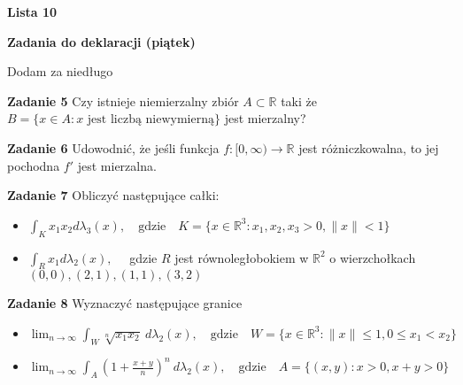 \documentclass[a4paper,11pt]{article}
\newcommand{\RR}{\mathbb{R}}
\begin{document}
\begin{center}
  {\large\textbf{Lista 10}}
\end{center}

\hrulefill
\begin{center}
    \textbf{Zadania do deklaracji (piątek)}
\end{center}

\bigskip

Dodam za niedługo

\bigskip

\hrulefill

\bigskip

\textbf{Zadanie 5} Czy istnieje niemierzalny zbiór $A \subset \RR$ taki że 
$B= \{x \in A : x \text{~jest liczbą niewymierną}\}$ jest mierzalny?

\bigskip

\textbf{Zadanie 6} Udowodnić, że jeśli funkcja $f : [0,\infty) \to \RR$
jest różniczkowalna, to jej pochodna $f'$ jest mierzalna.

\bigskip

\textbf{Zadanie 7} Obliczyć następujące całki:

\begin{itemize}
  \item $\int_K x_1 x_2 d \lambda_3(x), \quad \text{gdzie} \quad K = \{x
    \in \RR^3: x_1,x_2,x_3 > 0,  \|x\| < 1\} $
  \item $\int_{R} x_1 d \lambda_2(x), \quad$ gdzie $R$ jest
    równoległobokiem w $\RR^2$ o wierzchołkach $(0,0), (2,1), (1,1),
    (3,2)$
\end{itemize}

\bigskip

\textbf{Zadanie 8} Wyznaczyć następujące granice 

\begin{itemize}
  \item $\lim_{n \to \infty} \int_{W} \sqrt[n]{x_1x_2}~ d\lambda_2(x),
    \quad \text{gdzie} \quad W = \{x \in \RR^3: \|x\|\le 1, 0\le
    x_1<x_2\} $
  \item $\lim_{n \to \infty} \int_{A} \left( 1+\frac{x+y}{n} \right)^n ~
    d\lambda_2(x), \quad \text{gdzie} \quad A = \{(x,y) : x>0, x+y>0\} $
\end{itemize}
\end{document}
